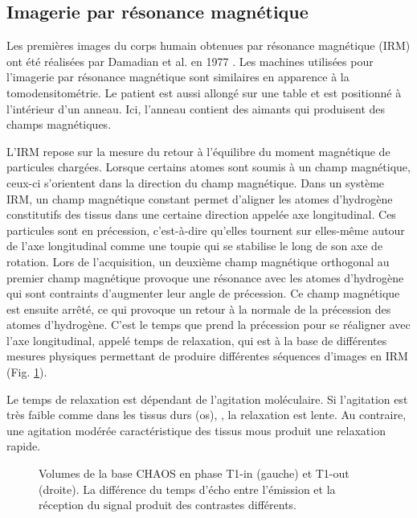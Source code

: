 \subsection{Imagerie par résonance magnétique}
\label{sec:contexte:images:irm}
Les premières images du corps humain obtenues par résonance magnétique (IRM) ont été réalisées par Damadian et al. en 1977 \cite{Damadian1977_NMRI}. Les machines utilisées pour l'imagerie par résonance magnétique sont similaires en apparence à la tomodensitométrie. Le patient est aussi allongé sur une table et est positionné à l'intérieur d'un anneau. Ici, l'anneau contient des aimants qui produisent des champs magnétiques.

L'IRM repose sur la mesure du retour à l'équilibre du moment magnétique de particules chargées. Lorsque certains atomes sont soumis à un champ magnétique, ceux-ci s'orientent dans la direction du champ magnétique. Dans un système IRM, un champ magnétique constant permet d'aligner les atomes d'hydrogène constitutifs des tissus dans une certaine direction appelée axe longitudinal. Ces particules sont en précession, c'est-à-dire qu'elles tournent sur elles-même autour de l'axe longitudinal comme une toupie qui se stabilise le long de son axe de rotation. Lors de l'acquisition, un deuxième champ magnétique orthogonal au premier champ magnétique provoque une résonance avec les atomes d'hydrogène qui sont contraints d'augmenter leur angle de précession. Ce champ magnétique est ensuite arrêté, ce qui provoque un retour à la normale de la précession des atomes d'hydrogène. C'est le temps que prend la précession pour se réaligner avec l'axe longitudinal, appelé temps de relaxation, qui est à la base de différentes mesures physiques permettant de produire différentes séquences d'images en IRM (Fig. \ref{fig:T1_MRI}).

Le temps de relaxation est dépendant de l'agitation moléculaire. Si l'agitation est très faible comme dans les tissus durs (os), , la relaxation est lente. Au contraire, une agitation modérée caractéristique des tissus mous produit une relaxation rapide.
\begin{figure}
    \centering
    \caption{Volumes de la base CHAOS en phase T1-in (gauche) et T1-out (droite). La différence du temps d'écho entre l'émission et la réception du signal produit des contrastes différents.}
    \label{fig:T1_MRI}
\end{figure}
